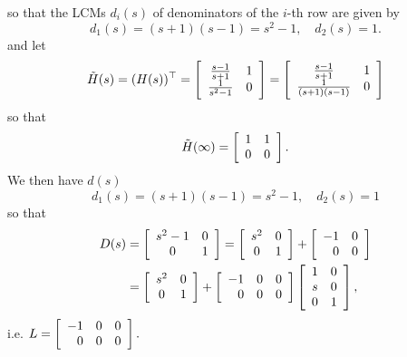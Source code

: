 \documentclass{article}
\begin{document}
so that the LCMs $d_i(s)$ of denominators of the $i$-th row are given
by
$$
d_1(s) = (s+1)(s-1) = s^2 - 1, \quad
d_2(s) = 1.
$$
and let
$$
\tilde{H}(s) = (H(s))^\top =
\left[\begin{array}{c c}
  \frac{s-1}{s+1}   & 1 \\
  \frac{1}{s^2 - 1} & 0
\end{array}\right] =
\left[\begin{array}{c c}
  \frac{s-1}{s+1}      & 1 \\
  \frac{1}{(s+1)(s-1)} & 0
\end{array}\right]
$$
so that
$$
\tilde{H}(\infty) =
\left[\begin{array}{c c}
  1 & 1 \\
  0 & 0
\end{array}\right].
$$
We then have
$d(s)$
$$
d_1(s) = (s+1)(s-1) = s^2 - 1, \quad
d_2(s) = 1
$$
so that
\begin{align*}
D(s) &=
\left[\begin{array}{c c}
  s^2-1 & 0 \\
  0     & 1
\end{array}\right]
=
\left[\begin{array}{c c}
  s^2 & 0 \\
  0   & 1
\end{array}\right]
+
\left[\begin{array}{r r}
  -1 & 0 \\
   0 & 0
\end{array}\right]
\\ &=
\left[\begin{array}{c c}
  s^2 & 0 \\
  0   & 1
\end{array}\right]
+
\left[\begin{array}{r r r}
  -1 & 0 & 0 \\
   0 & 0 & 0
\end{array}\right]
\left[\begin{array}{c c}
  1 & 0 \\
  s & 0 \\
  0 & 1
\end{array}\right],
\end{align*}
i.e. $
L =
\left[\begin{array}{r r r}
  -1 & 0 & 0 \\
   0 & 0 & 0
\end{array}\right].
$
\end{document}
